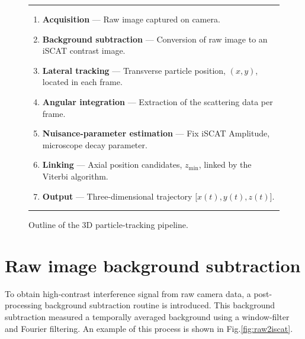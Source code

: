 \begin{figure}[htbp]
    \centering
    \begin{minipage}{0.78\textwidth}
        \rule{\linewidth}{0.8pt}\vspace{4pt}
        \begin{enumerate}[label=\arabic*., leftmargin=*, labelsep=0.75em, itemsep=2pt, parsep=0pt, topsep=2pt]
            \item \textbf{Acquisition} --- Raw image captured on camera.
            \item \textbf{Background subtraction} --- Conversion of raw image to an iSCAT contrast image.
            \item \textbf{Lateral tracking} --- Transverse particle position, $(x,y)$, located in each frame.
            \item \textbf{Angular integration} --- Extraction of the scattering data per frame.
            \item \textbf{Nuisance-parameter estimation} --- Fix iSCAT Amplitude, microscope decay parameter.
            \item \textbf{Linking} --- Axial position candidates, $z_\mathrm{min}$, linked by the Viterbi algorithm.
            \item \textbf{Output} --- Three-dimensional trajectory $\bigl[x(t),y(t),z(t)\bigr]$.
        \end{enumerate}
        \vspace{4pt}\rule{\linewidth}{0.8pt}
    \end{minipage}
    \caption{Outline of the 3D particle-tracking pipeline.}
    \label{fig:method_outline}
\end{figure}


\section{Raw image background subtraction}

To obtain high-contrast interference signal from raw camera data, a post-processing background subtraction routine is introduced. This background subtraction measured a temporally averaged background using a window-filter and Fourier filtering. An example of this process is shown in Fig.\ref{fig:raw2iscat}.

